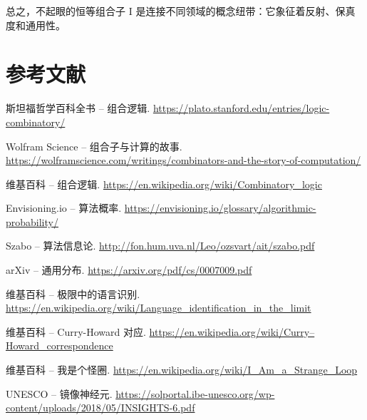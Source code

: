 \documentclass[12pt]{article}
\begin{document}
总之，不起眼的恒等组合子 I 是连接不同领域的概念纽带：它象征着反射、保真度和通用性。

\section{参考文献}

\begin{thebibliography}{10} %

 斯坦福哲学百科全书 – 组合逻辑. \url{https://plato.stanford.edu/entries/logic-combinatory/}

 Wolfram Science – 组合子与计算的故事. \url{https://wolframscience.com/writings/combinators-and-the-story-of-computation/}

 维基百科 – 组合逻辑. \url{https://en.wikipedia.org/wiki/Combinatory_logic}

 Envisioning.io – 算法概率. \url{https://envisioning.io/glossary/algorithmic-probability/}

 Szabo – 算法信息论. \url{http://fon.hum.uva.nl/Leo/ozsvart/ait/szabo.pdf}

 arXiv – 通用分布. \url{https://arxiv.org/pdf/cs/0007009.pdf}

 维基百科 – 极限中的语言识别. \url{https://en.wikipedia.org/wiki/Language_identification_in_the_limit}

 维基百科 – Curry-Howard 对应. \url{https://en.wikipedia.org/wiki/Curry–Howard_correspondence}

 维基百科 – 我是个怪圈. \url{https://en.wikipedia.org/wiki/I_Am_a_Strange_Loop}

 UNESCO – 镜像神经元. \url{https://solportal.ibe-unesco.org/wp-content/uploads/2018/05/INSIGHTS-6.pdf}

\end{thebibliography}
\end{document}
